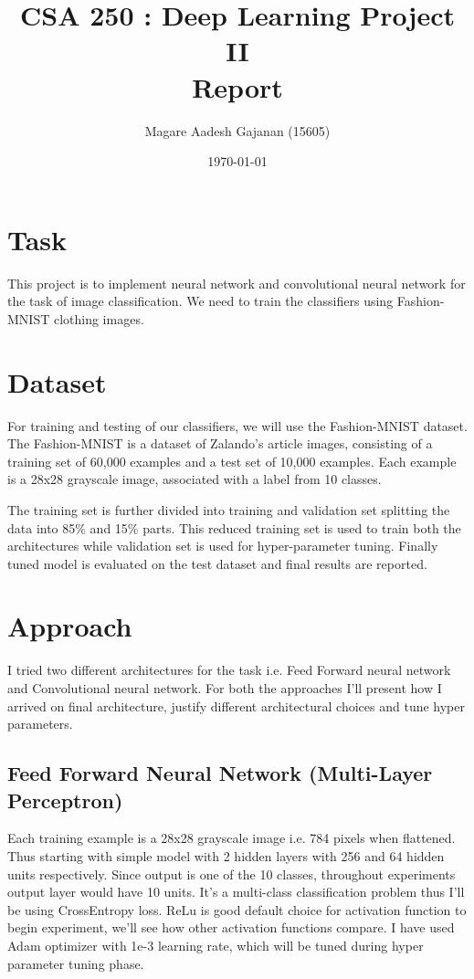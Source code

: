 \documentclass[10pt,a4paper]{article}
\title{CSA 250 : Deep Learning Project II \\ Report}
\author{Magare Aadesh Gajanan (15605)}
\date{\today}
\begin{document}
\maketitle
\section{Task}

This project is to implement neural network and convolutional neural network for the task of image classification. We need to train the classifiers using Fashion-MNIST clothing images.

\section{Dataset}

For training and testing of our classifiers, we will use the Fashion-MNIST dataset. The Fashion-MNIST is a dataset of Zalando's article images, consisting of a training set of 60,000 examples and a test set of 10,000 examples. Each example is a 28x28 grayscale image, associated with a label from 10 classes.

	The training set is further divided into training and validation set splitting the data into 85\% and 15\% parts. This reduced training set is used to train both the architectures while validation set is used for hyper-parameter tuning. Finally tuned model is evaluated on the test dataset and final results are reported.
	
\section{Approach}
I tried two different architectures for the task i.e. Feed Forward neural network and Convolutional neural network. For both the approaches I'll present how I arrived on final architecture, justify different architectural choices and tune hyper parameters.

\subsection{Feed Forward Neural Network (Multi-Layer Perceptron)}

Each training example is a 28x28 grayscale image i.e. 784 pixels when flattened. Thus starting with simple model with 2 hidden layers with 256 and 64 hidden units respectively. Since output is one of the 10 classes, throughout experiments output layer would have 10 units. It's a multi-class classification problem thus I'll be using CrossEntropy loss. ReLu is good default choice for activation function to begin experiment, we'll see how other activation functions compare. I have used Adam optimizer with 1e-3 learning rate, which will be tuned during hyper parameter tuning phase.
\end{document}
